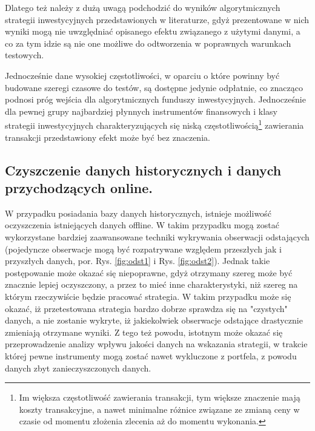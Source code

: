 \documentclass[a4paper,12pt,openany, DIV=calc, headsepline]{scrbook}
\begin{document}
Dlatego też należy z dużą uwagą podchodzić do wyników algorytmicznych strategii inwestycyjnych przedstawionych w literaturze, gdyż prezentowane w nich wyniki mogą nie uwzględniać opisanego efektu związanego z użytymi danymi, a co za tym idzie są nie one możliwe do odtworzenia w poprawnych warunkach testowych. 

Jednocześnie dane wysokiej częstotliwości, w oparciu o które powinny być budowane szeregi czasowe do testów, są dostępne jedynie odpłatnie, co znacząco podnosi próg wejścia dla algorytmicznych funduszy inwestycyjnych. Jednocześnie dla pewnej grupy najbardziej płynnych instrumentów finansowych i klasy strategii inwestycyjnych charakteryzujących się niską częstotliwością\footnote{Im większa częstotliwość zawierania transakcji, tym większe znaczenie mają koszty transakcyjne, a nawet minimalne różnice związane ze zmianą ceny w czasie od momentu złożenia zlecenia aż do momentu wykonania.} zawierania transakcji przedstawiony efekt może być bez znaczenia.

\subsection{Czyszczenie danych historycznych i danych przychodzących online.}

W przypadku posiadania bazy danych historycznych, istnieje możliwość oczyszczenia istniejących danych offline. W takim przypadku mogą zostać wykorzystane bardziej zaawansowane techniki wykrywania obserwacji odstających (pojedyncze obserwacje mogą być rozpatrywane względem przeszłych jak i przyszłych danych, por. Rys. \ref{fig:odst1} i Rys. \ref{fig:odst2}). Jednak takie postępowanie może okazać się niepoprawne, gdyż otrzymany szereg może być znacznie lepiej oczyszczony, a przez to mieć inne charakterystyki, niż szereg na którym rzeczywiście będzie pracować strategia. W takim przypadku może się okazać, iż przetestowana strategia bardzo dobrze sprawdza się na "czystych" danych, a nie zostanie wykryte, iż jakiekolwiek obserwacje odstające drastycznie zmieniają otrzymane wyniki. Z tego też powodu, istotnym może okazać się przeprowadzenie analizy wpływu jakości danych na wskazania strategii, w trakcie której pewne instrumenty mogą zostać nawet wykluczone z portfela, z powodu danych zbyt zanieczyszczonych danych.  
\end{document}
